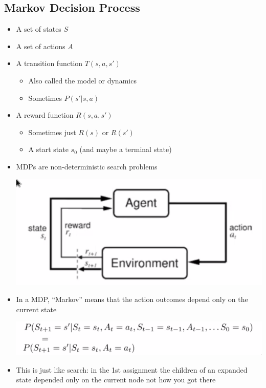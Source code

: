 \documentclass[11pt]{article}
\begin{document}
\subsection{Markov Decision Process}
\label{sec:org36721cd}
\begin{itemize}
\item A set of states \(S\)
\item A set of actions \(A\)
\item A transition function \(T(s, a, s')\)
\begin{itemize}
\item Also called the model or dynamics
\item Sometimes \(P(s'|s, a)\)
\end{itemize}
\item A reward function \(R(s, a, s')\)
\begin{itemize}
\item Sometimes just \(R(s)\) or \(R(s')\)
\item A start state \(s_0\) (and maybe a terminal state)
\end{itemize}
\item MDPs are non-deterministic search problems
\begin{center}
\includegraphics[width=.9\linewidth]{images/2020-09-03_18-05-59_screenshot.png}
\end{center}
\item In a MDP, ``Markov'' means that the action outcomes depend only on the current state
\begin{center}
\includegraphics[width=.9\linewidth]{images/2020-09-03_18-07-52_screenshot.png}
\end{center}
\item This is just like search: in the 1st assignment the children of an expanded state depended only on the current node not how you got there
\end{itemize}
\end{document}
